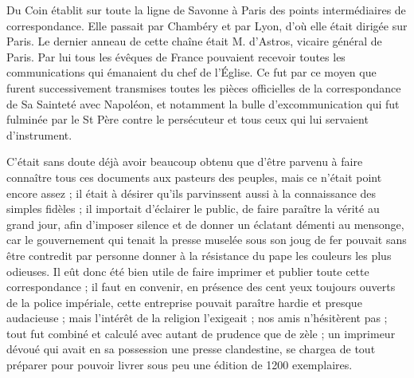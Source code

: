 Du Coin établit sur toute la ligne de Savonne à Paris des points intermédiaires de correspondance. Elle passait par Chambéry et par Lyon, d'où elle était dirigée sur Paris. Le dernier anneau de cette chaîne était M. d'Astros, vicaire général de Paris. Par lui tous les évêques de France pouvaient recevoir toutes les communications qui émanaient du chef de l'Église. Ce fut par ce moyen que furent successivement transmises toutes les pièces officielles de la correspondance de Sa Sainteté avec Napoléon, et notamment la bulle d'excommunication qui fut fulminée par le St Père contre le persécuteur et tous ceux qui lui servaient d'instrument.

C'était sans doute déjà avoir beaucoup obtenu que d'être parvenu à faire connaître tous ces documents aux pasteurs
des peuples, mais ce n'était point encore assez ; il était à désirer qu'ils parvinssent aussi à la connaissance des simples fidèles ; il importait d'éclairer le public, de faire paraître la vérité au grand jour, afin d'imposer silence et de donner un éclatant démenti au mensonge, car le gouvernement qui tenait la presse muselée sous son joug de fer pouvait sans être contredit par personne donner à la résistance du pape les couleurs les plus odieuses. Il eût donc été bien utile de faire imprimer et publier toute cette correspondance ; il faut en convenir, en présence des cent yeux toujours ouverts de la police impériale, cette entreprise pouvait paraître hardie et presque audacieuse ; mais l'intérêt de la religion l'exigeait ; nos amis n'hésitèrent pas ; tout fut combiné et calculé avec autant de prudence que de zèle ; un imprimeur dévoué qui avait en sa possession une presse clandestine, se chargea de tout préparer pour pouvoir livrer sous peu une édition de 1200 exemplaires.

